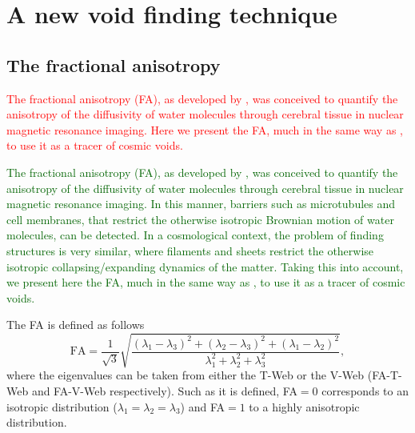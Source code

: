 \documentclass[a4,useAMS,usenatbib,usegraphicx]{mn2e}
\newcommand{\before}[1]{\textcolor{red}{ #1}}
\newcommand{\after}[1]{\textcolor{darkgreen}{ #1}}
\newcommand{\eq}[2]{\begin{equation} \label{eq:#1} #2 \end{equation}}
\begin{document}



\section{A new void finding technique}
\label{sec:bulk_voids}


\subsection{The fractional anisotropy}
\label{subsec:FA_voids}


\before{The fractional anisotropy (FA), as developed by \citet{Basser95}, was 
conceived to quantify the anisotropy of the diffusivity of water
molecules through cerebral tissue in nuclear magnetic resonance imaging. 
Here we present the FA, much in the same way as \citet{Libeskind13},
to use it as a tracer of cosmic voids.}


\after{The fractional anisotropy (FA), as developed by \citet{Basser95}, 
was conceived to quantify the anisotropy of the diffusivity of water
molecules through cerebral tissue in nuclear magnetic resonance imaging. 
In this manner, barriers such as microtubules and cell membranes, that 
restrict the otherwise isotropic Brownian motion of water molecules, can 
be detected. In a cosmological context, the problem of finding structures 
is very similar, where filaments and sheets restrict the otherwise 
isotropic collapsing/expanding dynamics of the matter. Taking this into 
account, we present here the FA, much in the same way as \citet{Libeskind13}, 
to use it as a tracer of cosmic voids.}


The FA is defined as follows
\eq{fractional_anisotropy}
{{\mathrm{FA}} = \frac{1}{\sqrt{3}}\sqrt{ \frac{ (\lambda_1 - \lambda_3)^2 + 
(\lambda_2 - \lambda_3)^2 + (\lambda_1 - \lambda_2)^2}{ \lambda_1^2 + 
\lambda_2^2 + \lambda_3^2} },}
where the eigenvalues can be taken from either the T-Web or the V-Web 
(FA-T-Web and FA-V-Web respectively). Such as it is defined, FA$=0$ 
corresponds to an isotropic distribution ($\lambda_1=\lambda_2=\lambda_3$) 
and FA$=1$ to a highly anisotropic distribution.
\end{document}
